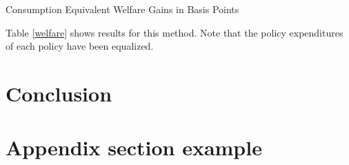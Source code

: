 \documentclass[11pt]{article}
\begin{document}
	\begin{table} 
		\center
		
		\caption{Consumption Equivalent Welfare Gains in Basis Points }
		\label{welfare}
	\end{table}
	
	Table \ref{welfare} shows results for this method. Note that the policy expenditures of each policy have been equalized.
	
	\section{Conclusion}
	
	\let\bibfont=\small
	
	
	
	\appendix
	\section{Appendix section example}
	
	
	
\end{document}
